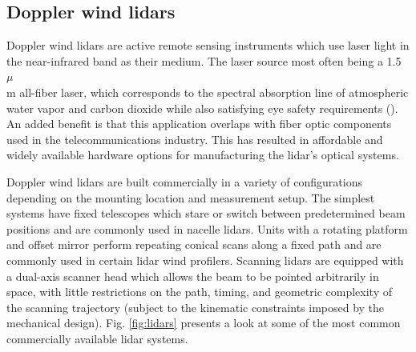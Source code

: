 

\clearpage
\subsection{Doppler wind lidars}
\label{sec:intro_lidar}

Doppler wind lidars are active remote sensing instruments which use laser light in the near-infrared band as their medium. The laser source most often being a 1.5 $\mu$\\m all-fiber laser, which corresponds to the spectral absorption line of atmospheric water vapor and carbon dioxide while also satisfying eye safety requirements (\cite{cariou_laser_2006}). An added benefit is that this application overlaps with fiber optic components used in the telecommunications industry. This has resulted in affordable and widely available hardware options for manufacturing the lidar's optical systems.

Doppler wind lidars are built commercially in a variety of configurations depending on the mounting location and measurement setup. The simplest systems have fixed telescopes which stare or switch between predetermined beam positions and are commonly used in nacelle lidars. Units with a rotating platform and offset mirror perform repeating conical scans along a fixed path and are commonly used in certain lidar wind profilers. Scanning lidars are equipped with a dual-axis scanner head which allows the beam to be pointed arbitrarily in space, with little restrictions on the path, timing, and geometric complexity of the scanning trajectory (subject to the kinematic constraints imposed by the mechanical design). Fig. \ref{fig:lidars} presents a look at some of the most common commercially available lidar systems.


